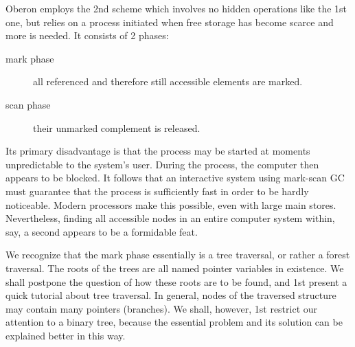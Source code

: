Oberon employs the 2nd scheme which involves no hidden operations like the 1st one, but
relies on a process initiated when free storage has become scarce and more is needed.
It consists of 2 phases:
\begin{description}
  \item[mark phase] all referenced and therefore still accessible elements are marked.
  \item[scan phase] their unmarked complement is released.
\end{description}
Its primary disadvantage is that the process may be started at moments unpredictable to the
system's user. During the process, the computer then appears to be blocked. It follows that
an interactive system using mark-scan GC must guarantee that the process is sufficiently
fast in order to be hardly noticeable. Modern processors make this possible, even with
large main stores. Nevertheless, finding all accessible nodes in an entire computer system
within, say, a second appears to be a formidable feat.

We recognize that the mark phase essentially is a tree traversal, or rather a forest traversal.
The roots of the trees are all named pointer variables in existence. We shall postpone the
question of how these roots are to be found, and 1st present a quick tutorial about tree
traversal. In general, nodes of the traversed structure may contain many pointers (branches).
We shall, however, 1st restrict our attention to a binary tree, because the essential problem
and its solution can be explained better in this way.

